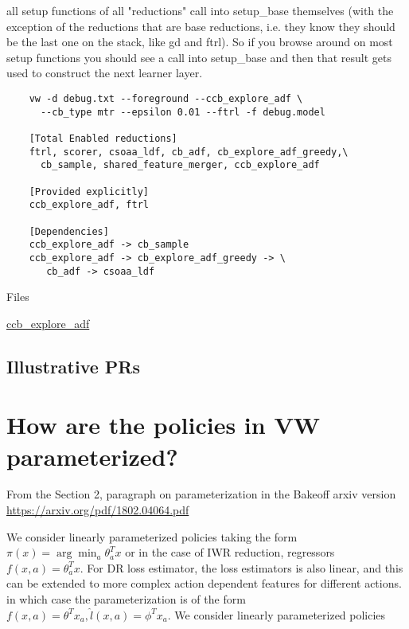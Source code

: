 \documentclass[preview,border={30 30 30 30}]{standalone}
\begin{document}
all setup functions of all "reductions" call into setup\_base themselves (with the exception of the reductions that are base reductions, i.e. they know they should be the last one on the stack, like gd and ftrl). So if you browse around on most setup functions you should see a call into setup\_base and then that result gets used to construct the next learner layer. 

\begin{verbatim}
    vw -d debug.txt --foreground --ccb_explore_adf \
      --cb_type mtr --epsilon 0.01 --ftrl -f debug.model
    
    [Total Enabled reductions]
    ftrl, scorer, csoaa_ldf, cb_adf, cb_explore_adf_greedy,\
      cb_sample, shared_feature_merger, ccb_explore_adf
    
    [Provided explicitly]
    ccb_explore_adf, ftrl
    
    [Dependencies]
    ccb_explore_adf -> cb_sample
    ccb_explore_adf -> cb_explore_adf_greedy -> \
       cb_adf -> csoaa_ldf
\end{verbatim}

Files

\href{https://github.com/VowpalWabbit/vowpal_wabbit/blob/27a60b36e236bd72845b69bc8dfa0646974bbbd1/vowpalwabbit/conditional_contextual_bandit.cc}{ccb\_explore\_adf}

\subsection{Illustrative PRs}

\section{How are the policies in VW parameterized?}
From the Section 2, paragraph on parameterization  in the Bakeoff arxiv version \url{https://arxiv.org/pdf/1802.04064.pdf}

We consider linearly parameterized policies taking the form $\pi(x) = \arg\min_a \theta_a^T x$ or in the case of IWR reduction, regressors $f(x,a) = \theta_a^Tx$. For DR loss estimator, the loss estimators is also linear, and this can be extended to more complex action dependent features for different actions. in which case the parameterization is of the form $f(x,a) = \theta^T x_a, \hat{l}(x,a) = \phi^T x_a$.
We consider linearly parameterized policies 
\end{document}
